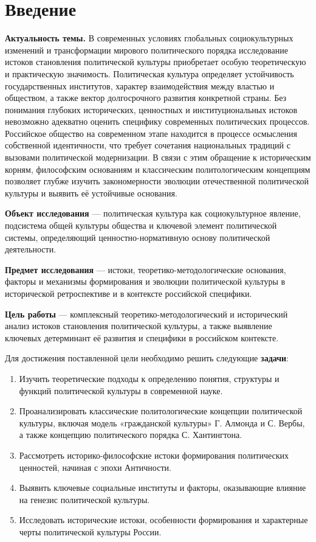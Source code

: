 \section*{Введение}

{\bf Актуальность темы.} В современных условиях глобальных социокультурных изменений и трансформации мирового политического порядка исследование истоков становления политической культуры приобретает особую теоретическую и практическую значимость. Политическая культура определяет устойчивость государственных институтов, характер взаимодействия между властью и обществом, а также вектор долгосрочного развития конкретной страны. Без понимания глубоких исторических, ценностных и институциональных истоков невозможно адекватно оценить специфику современных политических процессов. Российское общество на современном этапе находится в процессе осмысления собственной идентичности, что требует сочетания национальных традиций с вызовами политической модернизации. В связи с этим обращение к историческим корням, философским основаниям и классическим политологическим концепциям позволяет глубже изучить закономерности эволюции отечественной политической культуры и выявить её устойчивые основания.

{\bf Объект исследования} — политическая культура как социокультурное явление, подсистема общей культуры общества и ключевой элемент политической системы, определяющий ценностно-нормативную основу политической деятельности.

{\bf Предмет исследования} — истоки, теоретико-методологические основания, факторы и механизмы формирования и эволюции политической культуры в исторической ретроспективе и в контексте российской специфики.

{\bf Цель работы} — комплексный теоретико-методологический и исторический анализ истоков становления политической культуры, а также выявление ключевых детерминант её развития и специфики в российском контексте.

Для достижения поставленной цели необходимо решить следующие {\bf задачи}:
\begin{enumerate}
    \item Изучить теоретические подходы к определению понятия, структуры и функций политической культуры в современной науке.
    \item Проанализировать классические политологические концепции политической культуры, включая модель «гражданской культуры» Г. Алмонда и С. Вербы, а также концепцию политического порядка С. Хантингтона.
    \item Рассмотреть историко-философские истоки формирования политических ценностей, начиная с эпохи Античности.
    \item Выявить ключевые социальные институты и факторы, оказывающие влияние на генезис политической культуры.
    \item Исследовать исторические истоки, особенности формирования и характерные черты политической культуры России.
\end{enumerate}


